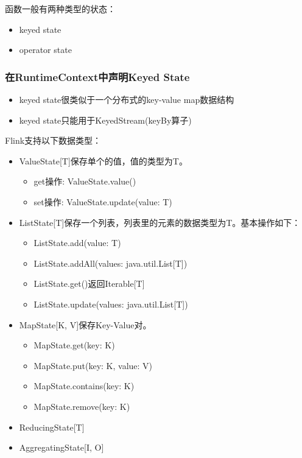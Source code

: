 \documentclass[oneside]{ctexbook}
\begin{document}
函数一般有两种类型的状态：

\begin{itemize}
\item keyed state
\item operator state
\end{itemize}

\subsubsection{在RuntimeContext中声明Keyed State}

\begin{itemize}
  \item keyed state很类似于一个分布式的key-value map数据结构
  \item keyed state只能用于KeyedStream(keyBy算子)
\end{itemize}

Flink支持以下数据类型：

\begin{itemize}
\item ValueState[T]保存单个的值，值的类型为T。
\begin{itemize}
\item get操作: ValueState.value()
\item set操作: ValueState.update(value: T)
\end{itemize}
\item ListState[T]保存一个列表，列表里的元素的数据类型为T。基本操作如下：
\begin{itemize}
\item ListState.add(value: T)
\item ListState.addAll(values: java.util.List[T])
\item ListState.get()返回Iterable[T]
\item ListState.update(values: java.util.List[T])
\end{itemize}
\item MapState[K, V]保存Key-Value对。
\begin{itemize}
\item MapState.get(key: K)
\item MapState.put(key: K, value: V)
\item MapState.contains(key: K)
\item MapState.remove(key: K)
\end{itemize}
\item ReducingState[T]
\item AggregatingState[I, O]
\end{itemize}
\end{document}
